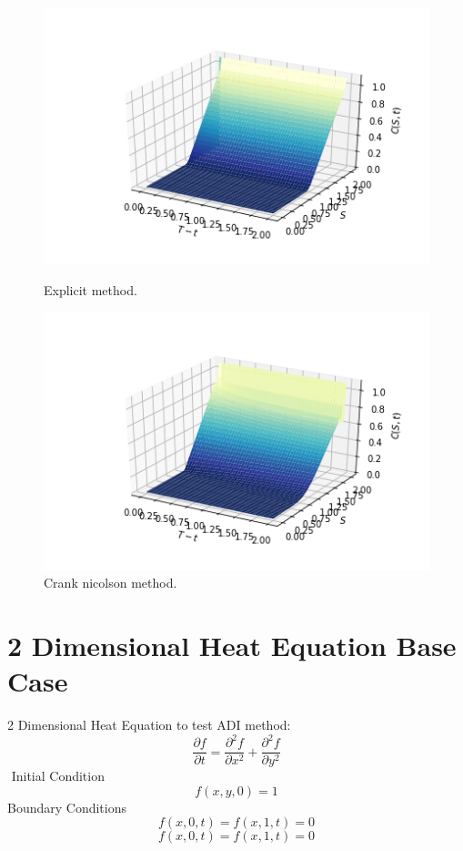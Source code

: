 \documentclass[12pt, oneside]{book}
\theoremstyle{plain}
\theoremstyle{definition}
\begin{document}
\begin{figure}[!htb]
  \begin{minipage}[b]{0.5\textwidth}
    \includegraphics[width=\textwidth]{BSExplicitGrid.png}
    \caption{Explicit method.}
  \end{minipage}
  \begin{minipage}[b]{0.5\textwidth}
    \includegraphics[width=\textwidth]{BSCNGrid.png}
    \caption{Crank nicolson method.}
  \end{minipage}
\end{figure}

\section{2 Dimensional Heat Equation Base Case}
2 Dimensional Heat Equation to test ADI method:
\begin{equation}
\frac{\partial f}{\partial t} = \frac{\partial^2 f}{\partial x^2} +\frac{\partial^2 f}{\partial y^2}
\end{equation}$  $
Initial Condition
\begin{equation}
f(x,y,0) = 1
\end{equation}
Boundary Conditions
\begin{equation}
f(x, 0, t) = f(x, 1, t) = 0
\end{equation}
\begin{equation}
f(x, 0, t) = f(x, 1, t) = 0
\end{equation}
\end{document}

